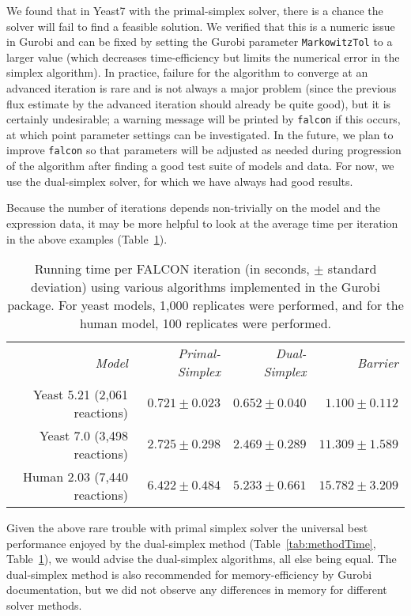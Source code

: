 We found that in Yeast7 with the primal-simplex solver, there is a
chance the solver will fail to find a feasible solution.
We verified that this is a numeric issue
in Gurobi and can be fixed by setting the Gurobi parameter
\texttt{MarkowitzTol} to a larger value (which decreases
time-efficiency but limits the numerical error in the
simplex algorithm). In practice, failure for the algorithm to converge
at an advanced iteration is rare and is not always a major problem (since the previous
flux estimate by the advanced iteration should already be quite good), but it
is certainly undesirable; a warning message will be printed by
\texttt{falcon} if this occurs, at which point parameter settings can
be investigated. In the future, we plan to improve \texttt{falcon} so
that parameters will be adjusted as needed during progression of the
algorithm after finding a good test suite of models and data. For now,
we use the dual-simplex solver, for which we have always had good
results.

Because the number of iterations depends non-trivially on the model
and the expression data, it may be more helpful to look at the 
average time per iteration in the above examples (Table~\ref{tab:methodTimeIter}).

\begin{table}
\begin{center}
\begin{tabular}{rrrr}
\emph{Model}                 & \emph{Primal-Simplex} & \emph{Dual-Simplex} & \emph{Barrier} \\
Yeast 5.21 (2,061 reactions) & $ 0.721 \pm 0.023 $ & $ 0.652 \pm 0.040 $ & $ 1.100 \pm 0.112  $\\ 
Yeast 7.0 (3,498 reactions)  & $ 2.725 \pm 0.298 $ & $ 2.469 \pm 0.289 $ & $ 11.309 \pm 1.589 $\\
Human 2.03 (7,440 reactions) & $ 6.422 \pm 0.484 $ & $ 5.233 \pm 0.661 $ & $ 15.782 \pm 3.209 $\\ 
\end{tabular}
\end{center}
\caption{Running time per FALCON iteration (in seconds, $\pm$ standard
  deviation) using various algorithms implemented in the Gurobi
  package.  For yeast models, 1,000 replicates were performed, and for
  the human model, 100 replicates were performed.}
\label{tab:methodTimeIter}
\end{table}

Given the above rare trouble with primal simplex solver the universal
best performance enjoyed by the dual-simplex method (Table~\ref{tab:methodTime},
Table~\ref{tab:methodTimeIter}), we would advise the dual-simplex algorithms, all else
being equal. The dual-simplex method is also recommended for
memory-efficiency by Gurobi documentation, but we did not observe any
differences in memory for different solver methods.


